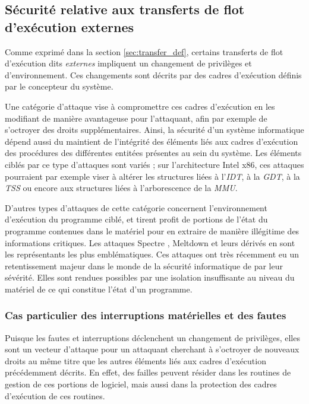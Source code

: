 		\subsection{Sécurité relative aux transferts de flot d'exécution externes}

			Comme exprimé dans la section \ref{sec:transfer_def}, certains transferts de flot d'exécution dits \emph{externes} impliquent un changement de privilèges et d'environnement. Ces changements sont décrits par des cadres d'exécution définis par le concepteur du système.

			Une catégorie d'attaque vise à compromettre ces cadres d'exécution en les modifiant de manière avantageuse pour l'attaquant, afin par exemple de s'octroyer des droits supplémentaires. Ainsi, la sécurité d'un système informatique dépend aussi du maintient de l'intégrité des éléments liés aux cadres d'exécution des procédures des différentes entitées présentes au sein du système. Les éléments ciblés par ce type d'attaques sont variés ; sur l'architecture Intel x86, ces attaques pourraient par exemple viser à altérer les structures liées à l'\emph{IDT}, à la \emph{GDT}, à la \emph{TSS} ou encore aux structures liées à l'arborescence de la \emph{MMU}.

			D'autres types d'attaques de cette catégorie concernent l'environnement d'exécution du programme ciblé, et tirent profit de portions de l'état du programme contenues dans le matériel pour en extraire de manière illégitime des informations critiques. Les attaques Spectre \cite{kocher2020spectre}, Meltdown \cite{lipp2020meltdown} et leurs dérivés en sont les représentants les plus emblématiques. Ces attaques ont très récemment eu un retentissement majeur dans le monde de la sécurité informatique de par leur sévérité. Elles sont rendues possibles par une isolation insuffisante au niveau du matériel de ce qui constitue l'état d'un programme.

		\subsubsection{Cas particulier des interruptions matérielles et des fautes}

Puisque les fautes et interruptions déclenchent un changement de privilèges, elles sont un vecteur d'attaque pour un attaquant cherchant à s'octroyer de nouveaux droits au même titre que les autres éléments liés aux cadres d'exécution précédemment décrits. En effet, des failles peuvent résider dans les routines de gestion de ces portions de logiciel, mais aussi dans la protection des cadres d'exécution de ces routines. 

